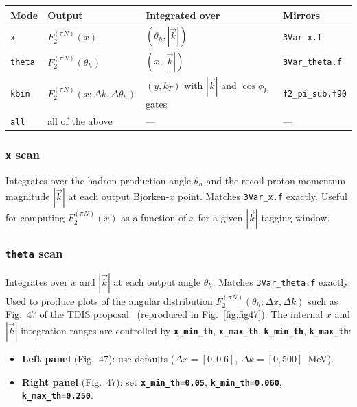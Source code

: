 \documentclass[11pt,a4paper]{article}
\newcommand{\code}[1]{\texttt{#1}}
\newcommand{\inikey}[1]{\texttt{\textbf{#1}}}
\begin{document}
\begin{center}
\begin{tabular}{llp{4.2cm}p{3.8cm}}
\toprule
\textbf{Mode} & \textbf{Output} & \textbf{Integrated over}
  & \textbf{Mirrors} \\
\midrule
\code{x}     & $F_2^{(\pi N)}(x)$
  & $(\theta_h, |\vec{k}|)$
  & \texttt{3Var\_x.f} \\
\code{theta} & $F_2^{(\pi N)}(\theta_h)$
  & $(x, |\vec{k}|)$
  & \texttt{3Var\_theta.f} \\
\code{kbin}  & $F_2^{(\pi N)}(x;\Delta k,\Delta\theta_h)$
  & $(y, k_T)$ with $|\vec{k}|$ and $\cos\phi_k$ gates
  & \texttt{f2\_pi\_sub.f90} \\
\code{all}   & all of the above & --- & --- \\
\bottomrule
\end{tabular}
\end{center}

\subsubsection{\code{x} scan}

Integrates over the hadron production angle $\theta_h$ and the recoil
proton momentum magnitude $|\vec{k}|$ at each output Bjorken-$x$ point.
Matches \texttt{3Var\_x.f} exactly.  Useful for computing
$F_2^{(\pi N)}(x)$ as a function of $x$ for a given $|\vec{k}|$ tagging
window.

\subsubsection{\code{theta} scan}

Integrates over $x$ and $|\vec{k}|$ at each output angle $\theta_h$.
Matches \texttt{3Var\_theta.f} exactly.  Used to produce
plots of the angular distribution $F_2^{(\pi N)}(\theta_h;\Delta x, \Delta k)$
such as Fig.~47 of the TDIS proposal~\cite{TDIS15}
(reproduced in Fig.~\ref{fig:fig47}).
The internal $x$ and $|\vec{k}|$ integration ranges are controlled by
\inikey{x\_min\_th}, \inikey{x\_max\_th}, \inikey{k\_min\_th},
\inikey{k\_max\_th}:
\begin{itemize}
  \item \textbf{Left panel} (Fig.~47): use defaults
    ($\Delta x=[0, 0.6]$, $\Delta k=[0, 500]$~MeV).
  \item \textbf{Right panel} (Fig.~47): set
    \inikey{x\_min\_th=0.05}, \inikey{k\_min\_th=0.060},
    \inikey{k\_max\_th=0.250}.
\end{itemize}
\end{document}

